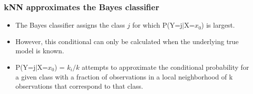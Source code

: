 \documentclass[12pt, oneside]{article}
\begin{document}
\subsubsection{kNN approximates the Bayes classifier}
\begin{itemize}
    \item The Bayes classifier assigns the class $j$ for which P(Y=j$|$X=$x_0$) is largest.
    \item However, this conditional can only be calculated when the underlying true model is known.
    \item P(Y=j$|$X=$x_0$) = $k_i/k$ attempts to approximate the conditional probability for a given class with a fraction of observations in a local neighborhood of k observations that correspond to that class. 
\end{itemize}
\end{document}
